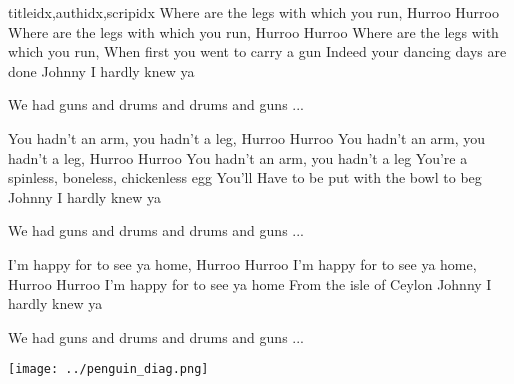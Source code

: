 \documentclass[14pt,letterpaper,norsk]{article}
\begin{document}
\begin{songs}{titleidx,authidx,scripidx}
\beginverse
Where are the legs with which you run,
Hurroo Hurroo
Where are the legs with which you run,
Hurroo Hurroo
Where are the legs with which you run,
When first you went to carry a gun
Indeed your dancing days are done
Johnny I hardly knew ya
\endverse

\beginchorus
We had guns and drums and drums and guns ...
\endchorus

\beginverse
You hadn't an arm, you hadn't a leg,
Hurroo Hurroo
You hadn't an arm, you hadn't a leg,
Hurroo Hurroo
You hadn't an arm, you hadn't a leg
You're a spinless, boneless, chickenless egg
You'll Have to be put with the bowl to beg
Johnny I hardly knew ya
\endverse

\beginchorus
We had guns and drums and drums and guns ...
\endchorus

\beginverse
I'm happy for to see ya home,
Hurroo Hurroo
I'm happy for to see ya home,
Hurroo Hurroo
I'm happy for to see ya home
From the isle of Ceylon
Johnny I hardly knew ya
\endverse

\beginchorus
We had guns and drums and drums and guns ...
\endchorus
\endsong

\end{songs}

\newpage

\texttt{[image: ../penguin\_diag.png]}
\end{document}
